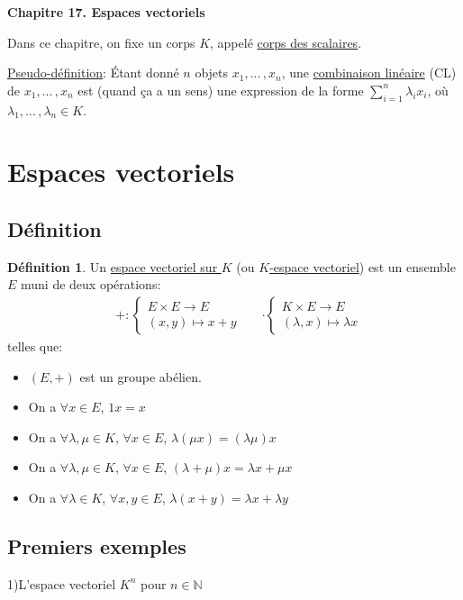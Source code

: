 \documentclass[10pt,a4paper]{article}
\theoremstyle{plain}
\theoremstyle{definition}
\newtheorem{definition}[proposition]{Définition}
\begin{document}
\renewcommand{\labelitemi}{$*$}
\renewcommand{\labelenumi}{(\roman{enumi})}
\begin{center}
{\Large \textbf{Chapitre 17. Espaces vectoriels}}
\end{center}
Dans ce chapitre, on fixe un corps $K$, appelé \uline{corps des scalaires}. \medskip

\uline{Pseudo-définition}: Étant donné $n$ objets $x_1, ...\, , x_n$, une \uline{combinaison linéaire} (CL) de $x_1, ...\, , x_n$ est (quand ça a un sens) une expression de la forme $\sum\limits_{i = 1}^n \lambda_i x_i$, où $\lambda_1, ...\, , \lambda_n \in K$.

\section{Espaces vectoriels}
\subsection{Définition}
\begin{definition}
Un \uline{espace vectoriel sur $K$} (ou \uline{$K$-espace vectoriel}) est un ensemble $E$ muni de deux opérations:
\begin{align*}
&+: \begin{cases}
E \times E \to E \\
(x, y) \mapsto x + y
\end{cases}
&
&\cdot \begin{cases}
K \times E \to E \\
(\lambda, x) \mapsto \lambda x
\end{cases}
\end{align*}
telles que:
\begin{itemize}
\item $(E, +)$ est un groupe abélien.
\item On a $\forall x \in E$, $1 x = x$
\item On a $\forall \lambda, \mu \in K$, $\forall x \in E$, $\lambda(\mu x) = (\lambda \mu)x$
\item On a $\forall \lambda, \mu \in K$, $\forall x \in E$, $(\lambda + \mu) x = \lambda x + \mu x$
\item On a $\forall \lambda \in K$, $\forall x, y \in E$, $\lambda (x + y) = \lambda x + \lambda y$
\end{itemize}
\end{definition}

\subsection{Premiers exemples}
1)L'espace vectoriel $K^n$ pour $n \in \mathbb{N}$
\end{document}
